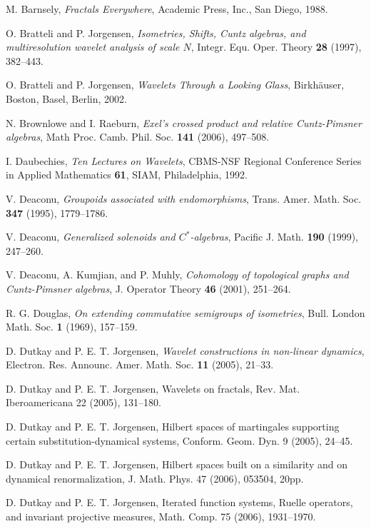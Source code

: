 \documentclass{amsproc}
\theoremstyle{plain}
\theoremstyle{definition}
\theoremstyle{definition}
\theoremstyle{remark}
\theoremstyle{plain}
\begin{document}
\begin{thebibliography}{10}
 M. Barnsely, \emph{Fractals Everywhere}, Academic
Press, Inc., San Diego, 1988.

O. Bratteli and P. Jorgensen, \emph{Isometries, Shifts,
Cuntz algebras, and multiresolution wavelet analysis of scale $N$},
Integr. Equ. Oper. Theory \textbf{28} (1997), 382--443. 

O. Bratteli and P. Jorgensen, \emph{Wavelets Through
a Looking Glass}, Birkh\"{a}user, Boston, Basel, Berlin, 2002.

N. Brownlowe and I. Raeburn, \emph{Exel's crossed product
and relative Cuntz-Pimsner algebras}, Math Proc. Camb. Phil. Soc.
\textbf{141} (2006), 497--508.

I. Daubechies, \emph{Ten Lectures on Wavelets}, CBMS-NSF
Regional Conference Series in Applied Mathematics \textbf{61}, SIAM,
Philadelphia, 1992.


V. Deaconu, \emph{Groupoids associated with endomorphisms},
Trans. Amer. Math. Soc. \textbf{347} (1995), 1779--1786.

V. Deaconu, \emph{Generalized solenoids and $C^{*}$-algebras},
Pacific J. Math. \textbf{190} (1999), 247--260.

V. Deaconu, A. Kumjian, and P. Muhly, \emph{Cohomology
of topological graphs and Cuntz-Pimsner algebras}, J. Operator Theory
\textbf{46} (2001), 251--264.

R. G. Douglas, \emph{On extending commutative semigroups
of isometries}, Bull. London Math. Soc. \textbf{1} (1969), 157--159.

D. Dutkay and P. E. T. Jorgensen, \emph{Wavelet constructions
in non-linear dynamics}, Electron. Res. Announc. Amer. Math. Soc.
\textbf{11} (2005), 21--33.

D. Dutkay and P. E. T. Jorgensen, Wavelets on fractals,
Rev. Mat. Iberoamericana 22 (2005), 131--180.

D. Dutkay and P. E. T. Jorgensen, Hilbert spaces of
martingales supporting certain substitution-dynamical systems, Conform.
Geom. Dyn. 9 (2005), 24--45.

D. Dutkay and P. E. T. Jorgensen, Hilbert spaces built
on a similarity and on dynamical renormalization, J. Math. Phys. 47
(2006), 053504, 20pp.

D. Dutkay and P. E. T. Jorgensen, Iterated function
systems, Ruelle operators, and invariant projective measures, Math.
Comp. 75 (2006), 1931--1970.


\end{thebibliography}
\end{document}

